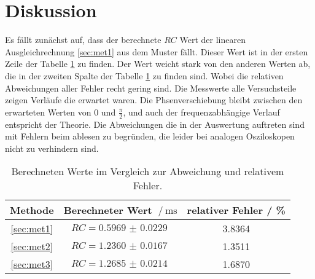 \section{Diskussion}
\label{sec:Diskussion}

Es fällt zunächst auf, dass der berechnete $RC$ Wert der linearen Ausgleichrechnung \ref{sec:met1} aus dem Muster fällt.
Dieser Wert ist in der ersten Zeile der Tabelle \ref{tab:fehler} zu finden.
Der Wert weicht stark von den anderen Werten ab, die in der zweiten Spalte der Tabelle \ref{tab:fehler} zu finden sind.
Wobei die relativen Abweichungen aller Fehler recht gering sind.
Die Messwerte alle Versuchsteile zeigen Verläufe die erwartet waren.
Die Phsenverschiebung bleibt zwischen den erwarteten Werten von $0$ und $\frac{\pi}{2}$, und auch der frequenzabhängige Verlauf entspricht der Theorie.
Die Abweichungen die in der Auswertung auftreten sind mit Fehlern beim ablesen zu begründen, die leider bei analogen Osziloskopen nicht zu verhindern sind.


\begin{table}
\centering
\caption{Berechneten Werte im Vergleich zur Abweichung und relativem Fehler.}
\begin{tabular}{c|cc}
    \toprule
    Methode & Berechneter Wert $ \:/\: \si{\milli\second} $ & relativer Fehler \:/\: \% \\
    \midrule
    \ref{sec:met1} & $RC = \SI{0.5969(229)}{}$ & 3.8364 \\
    \ref{sec:met2} & $RC = \SI{1.2360(167)}{}$ & 1.3511 \\
    \ref{sec:met3} & $RC = \SI{1.2685(214)}{}$ & 1.6870 \\ 
    \bottomrule
\end{tabular}
\label{tab:fehler}
\end{table}

